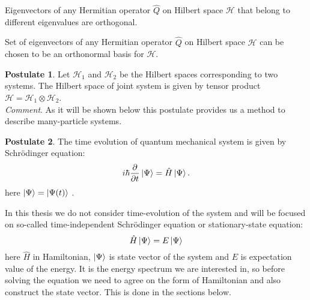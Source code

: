 \documentclass[twoside,english]{uiofysmaster}
\theoremstyle{definition}
\newtheorem{post}{Postulate}
\begin{document}
\begin{theorem}
	Eigenvectors of any Hermitian operator $\hat{Q}$ on Hilbert space $\mathscr{H}$ that belong to different eigenvalues are orthogonal. 
\end{theorem}

\begin{theorem}
Set of eigenvectors of any Hermitian operator $\hat{Q}$ on Hilbert space $\mathscr{H}$ can be chosen to be an orthonormal basis for $\mathscr{H}$.
\end{theorem}

\begin{post}
	Let $\mathscr{H}_1$ and $\mathscr{H}_2$ be the Hilbert spaces corresponding to two systems. The Hilbert space of joint system is given by tensor product $\mathscr{H}=\mathscr{H}_1 \otimes \mathscr{H}_2$.\\
\textit{Comment}. As it will be shown below this postulate provides us a method to describe many-particle systems. 
\end{post}
\begin{post}
The time evolution of quantum mechanical system is given by Schrödinger equation:
\begin{equation}\label{eq:basic_schrod}
 i \hbar \frac{\partial }{ \partial t}\ket{\Psi} = \hat{H}\ket{\Psi}.
\end{equation}
here $\ket{\Psi}=\ket{\Psi(t)}$ .
\end{post}
In this thesis we do not consider time-evolution of the system and will be focused on so-called time-independent Schrödinger equation or stationary-state equation:
\begin{equation}
\hat{H}\ket{\Psi} = E \ket{\Psi}
\end{equation}
here $\hat{H}$ in Hamiltonian, $\ket{\Psi}$ is state vector of the system and $E$ is expectation value of the energy. It is the energy spectrum we are interested in, so before solving the equation we need to agree on the form of Hamiltonian and also construct the state vector. This is done in the sections below.
\end{document}
